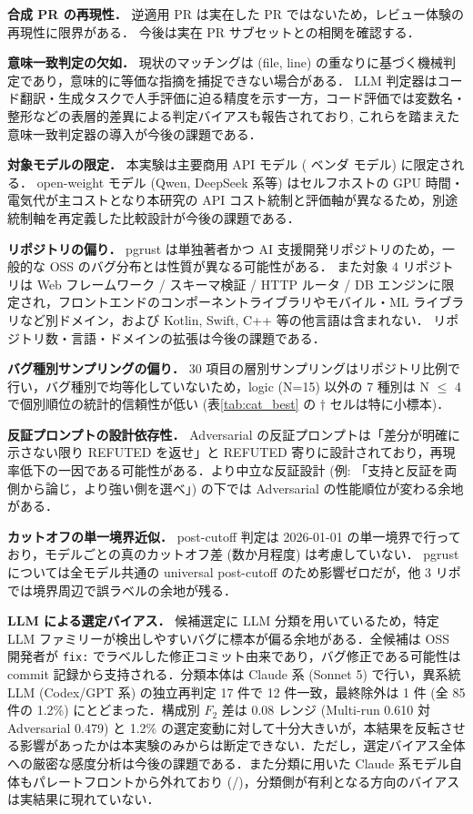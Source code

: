 \documentclass[a4j]{jarticle}
\begin{document}
\textbf{合成 PR の再現性．}
逆適用 PR は実在した PR ではないため，レビュー体験の再現性に限界がある．
今後は実在 PR サブセットとの相関を確認する．

\textbf{意味一致判定の欠如．}
現状のマッチングは (file, line) の重なりに基づく機械判定であり，意味的に等価な指摘を捕捉できない場合がある．
LLM 判定器\cite{zheng2023judgingllmasajudgemtbenchchatbot}はコード翻訳・生成タスクで人手評価に迫る精度を示す\cite{wang2025llmsreplacehumanevaluators}一方，コード評価では変数名・整形などの表層的差異による判定バイアスも報告されており\cite{moon2025dontjudgecodecover}, これらを踏まえた意味一致判定器の導入が今後の課題である．

\textbf{対象モデルの限定．}
本実験は主要商用 API モデル (\nVendors{} ベンダ \nModels{} モデル) に限定される．
open-weight モデル (Qwen, DeepSeek 系等) はセルフホストの GPU 時間・電気代が主コストとなり本研究の API コスト統制と評価軸が異なるため，別途統制軸を再定義した比較設計が今後の課題である．

\textbf{リポジトリの偏り．}
pgrust は単独著者かつ AI 支援開発リポジトリのため，一般的な OSS のバグ分布とは性質が異なる可能性がある．
また対象 4 リポジトリは Web フレームワーク / スキーマ検証 / HTTP ルータ / DB エンジンに限定され，フロントエンドのコンポーネントライブラリやモバイル・ML ライブラリなど別ドメイン，および Kotlin, Swift, C++ 等の他言語は含まれない．
リポジトリ数・言語・ドメインの拡張は今後の課題である．

\textbf{バグ種別サンプリングの偏り．}
30 項目の層別サンプリングはリポジトリ比例で行い，バグ種別で均等化していないため，logic (N=15) 以外の 7 種別は N $\le$ 4 で個別順位の統計的信頼性が低い (表\ref{tab:cat_best} の $\dagger$ セルは特に小標本)．

\textbf{反証プロンプトの設計依存性．}
Adversarial の反証プロンプトは「差分が明確に示さない限り REFUTED を返せ」と REFUTED 寄りに設計されており，再現率低下の一因である可能性がある．より中立な反証設計 (例: 「支持と反証を両側から論じ，より強い側を選べ」) の下では Adversarial の性能順位が変わる余地がある．

\textbf{カットオフの単一境界近似．}
post-cutoff 判定は 2026-01-01 の単一境界で行っており，モデルごとの真のカットオフ差 (数か月程度) は考慮していない．
pgrust については全モデル共通の universal post-cutoff のため影響ゼロだが，他 3 リポでは境界周辺で誤ラベルの余地が残る．

\textbf{LLM による選定バイアス．}
候補選定に LLM 分類を用いているため，特定 LLM ファミリーが検出しやすいバグに標本が偏る余地がある．全候補は OSS 開発者が \texttt{fix:} でラベルした修正コミット由来であり，バグ修正である可能性は commit 記録から支持される．分類本体は Claude 系 (Sonnet 5) で行い，異系統 LLM (Codex/GPT 系) の独立再判定 17 件で 12 件一致，最終除外は 1 件 (全 85 件の 1.2\%) にとどまった．構成別 $F_2$ 差は 0.08 レンジ (Multi-run 0.610 対 Adversarial 0.479) と 1.2\% の選定変動に対して十分大きいが，本結果を反転させる影響があったかは本実験のみからは断定できない．ただし，選定バイアス全体への厳密な感度分析は今後の課題である．また分類に用いた Claude 系モデル自体もパレートフロントから外れており (\dominatedCount{}/\nModels{})，分類側が有利となる方向のバイアスは実結果に現れていない．
\end{document}
